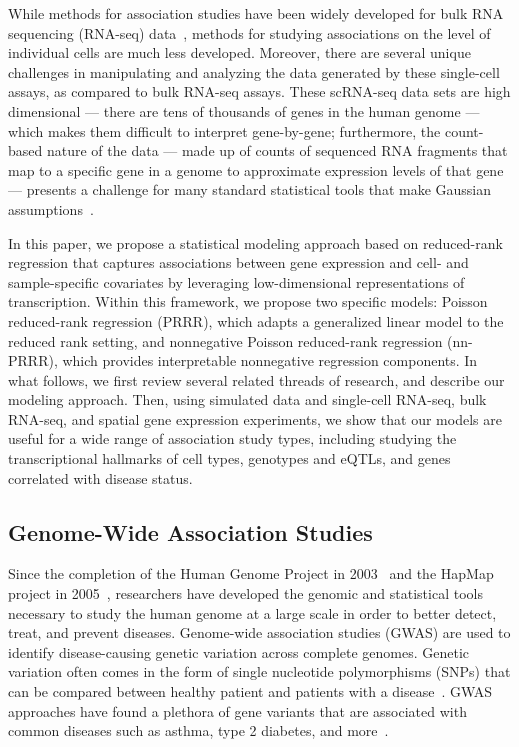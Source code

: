 \documentclass{bmcart}
\begin{document}
While methods for association studies have been widely developed for bulk RNA sequencing (RNA-seq) data~\citep{mccarthy2008genome,purcell2007plink}, methods for studying associations on the level of individual cells are much less developed. Moreover, there are several unique challenges in manipulating and analyzing the data generated by these single-cell assays, as compared to bulk RNA-seq assays. These scRNA-seq data sets are high dimensional --- there are tens of thousands of genes in the human genome --- which makes them difficult to interpret gene-by-gene; furthermore, the count-based nature of the data --- made up of counts of sequenced RNA fragments that map to a specific gene in a genome to approximate expression levels of that gene --- presents a challenge for many standard statistical tools that make Gaussian assumptions~\citep{GWASstatmethods}. 

In this paper, we propose a statistical modeling approach based on reduced-rank regression that captures associations between gene expression and cell- and sample-specific covariates by leveraging low-dimensional representations of transcription. Within this framework, we propose two specific models: Poisson reduced-rank regression (PRRR), which adapts a generalized linear model to the reduced rank setting, and nonnegative Poisson reduced-rank regression (nn-PRRR), which provides interpretable nonnegative regression components. In what follows, we first review several related threads of research, and describe our modeling approach. Then, using simulated data and single-cell RNA-seq, bulk RNA-seq, and spatial gene expression experiments, we show that our models are useful for a wide range of association study types, including studying the transcriptional hallmarks of cell types, genotypes and eQTLs, and genes correlated with disease status. 

\subsection*{Genome-Wide Association Studies}
\label{section:gwas}
Since the completion of the Human Genome Project in 2003~\citep{genomeproj} and the HapMap project in 2005~\citep{hapmap}, researchers have developed the genomic and statistical tools necessary to study the human genome at a large scale in order to better detect, treat, and prevent diseases. Genome-wide association studies (GWAS) are used to identify disease-causing genetic variation across complete genomes. Genetic variation often comes in the form of single nucleotide polymorphisms (SNPs) that can be compared between healthy patient and patients with a disease~\citep{plos}. GWAS approaches have found a plethora of gene variants that are associated with common diseases such as asthma, type 2 diabetes, and more~\citep{ober2011meta,frayling2007genome}. 
\end{document}
